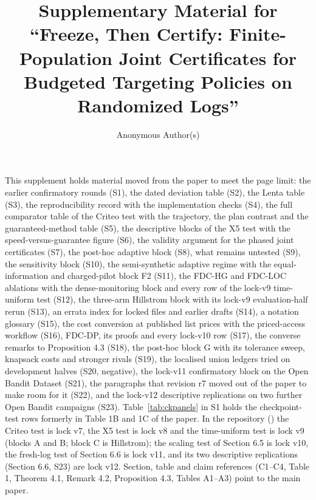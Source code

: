 \documentclass[sigconf,anonymous,review]{acmart}
\begin{document}
\sloppy
\title{Supplementary Material for ``Freeze, Then Certify: Finite-Population Joint Certificates for Budgeted Targeting Policies on Randomized Logs''}
\author{Anonymous Author(s)}
\maketitle

This supplement holds material moved from the paper to meet the page limit: the earlier confirmatory rounds (S1), the dated deviation table (S2), the Lenta table (S3), the reproducibility record with the implementation checks (S4), the full comparator table of the Criteo test with the trajectory, the plan contrast and the guaranteed-method table (S5), the descriptive blocks of the X5 test with the speed-versus-guarantee figure (S6), the validity argument for the phased joint certificates (S7), the post-hoc adaptive block (S8), what remains untested (S9), the sensitivity block (S10), the semi-synthetic adaptive regime with the equal-information and charged-pilot block F2 (S11), the FDC-HG and FDC-LOC ablations with the dense-monitoring block and every row of the lock-v9 time-uniform test (S12), the three-arm Hillstrom block with its lock-v9 evaluation-half rerun (S13), an errata index for locked files and earlier drafts (S14), a notation glossary (S15), the cost conversion at published list prices with the priced-access workflow (S16), FDC-DP, its proofs and every lock-v10 row (S17), the converse remarks to Proposition 4.3 (S18), the post-hoc block G with its tolerance sweep, knapsack costs and stronger rivals (S19), the localised union ledgers tried on development halves (S20, negative), the lock-v11 confirmatory block on the Open Bandit Dataset (S21), the paragraphs that revision r7 moved out of the paper to make room for it (S22), and the lock-v12 descriptive replications on two further Open Bandit campaigns (S23). Table~\ref{tab:ckpanels} in S1 holds the checkpoint-test rows formerly in Table 1B and 1C of the paper. In the repository (\anonrepo) the Criteo test is lock v7, the X5 test is lock v8 and the time-uniform test is lock v9 (blocks A and B; block C is Hillstrom); the scaling test of Section 6.5 is lock v10, the fresh-log test of Section 6.6 is lock v11, and its two descriptive replications (Section 6.6, S23) are lock v12. Section, table and claim references (C1--C4, Table 1, Theorem 4.1, Remark 4.2, Proposition 4.3, Tables A1--A3) point to the main paper.
\end{document}
